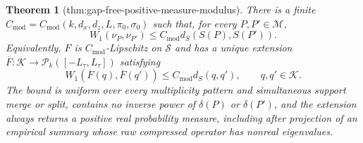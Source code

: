 \documentclass{article}
\newtheorem{theorem}{Theorem}
\begin{document}
\begin{theorem}[thm:gap-free-positive-measure-modulus]\label{thm:gap-free-positive-measure-modulus}
There is a finite \(C_{\mathrm{mod}}=C_{\mathrm{mod}}(k,d_x,d_z,L,\pi_0,\sigma_0)\) such that, for every \(P,P'\in\mathcal M\), \[W_1(\nu_P,\nu_{P'})\le C_{\mathrm{mod}}d_S(S(P),S(P')).\] Equivalently, \(F\) is \(C_{\mathrm{mod}}\)-Lipschitz on \(\mathscr S\) and has a unique extension \(\overline F:\mathcal K\to\mathcal P_k([-L_{\tau},L_{\tau}])\) satisfying \[W_1(\overline F(q),\overline F(q'))\le C_{\mathrm{mod}}d_S(q,q'),\qquad q,q'\in\mathcal K.\] The bound is uniform over every multiplicity pattern and simultaneous support merge or split, contains no inverse power of \(\delta(P)\) or \(\delta(P')\), and the extension always returns a positive real probability measure, including after projection of an empirical summary whose raw compressed operator has nonreal eigenvalues.
\end{theorem}
\end{document}
